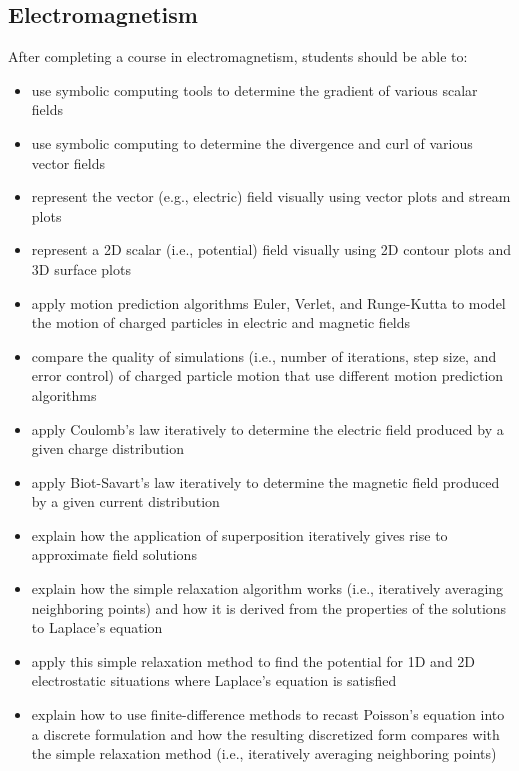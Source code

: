 \documentclass[graybox,envcountchap,sectrefs]{svmult}
\begin{document}
\subsection{Electromagnetism}
After completing a course in electromagnetism, students should be able to:
\begin{itemize}
\item use symbolic computing  tools to determine the gradient of various scalar fields

\item use symbolic computing  to determine the divergence and curl of various vector fields

\item represent the vector (e.g., electric) field visually using vector plots and stream plots

\item represent a 2D scalar (i.e., potential) field visually using 2D contour plots and 3D surface plots

\item apply motion prediction algorithms Euler, Verlet, and Runge-Kutta to model the motion of charged particles in electric and magnetic fields

\item compare the quality of simulations (i.e., number of iterations, step size, and error control) of charged particle motion that use different motion prediction algorithms

\item apply Coulomb's law iteratively to determine the electric field produced by a given charge distribution

\item apply Biot-Savart's law iteratively to determine the magnetic field produced by a given current distribution

\item explain how the application of superposition iteratively gives rise to approximate field solutions

\item explain how the simple relaxation algorithm works (i.e., iteratively averaging neighboring points) and how it is derived from the properties of the solutions to Laplace's equation

\item apply this simple relaxation method to find the potential for 1D and 2D electrostatic situations where Laplace's equation is satisfied

\item explain how to use  finite-difference methods to recast Poisson's equation into a discrete formulation and how the resulting discretized form compares with the simple relaxation method (i.e., iteratively averaging neighboring points)


\end{itemize}
\end{document}
